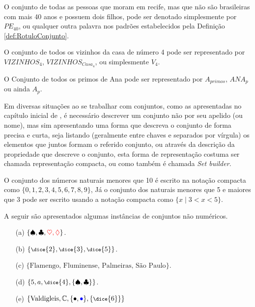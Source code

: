 \begin{exemplo}\label{exe:RotuloConjunto1}
  O conjunto de todas as pessoas que moram em recife, mas que não são brasileiras com mais 40 anos e possuem dois filhos, pode ser denotado simplesmente por $PE_{40}$, ou qualquer outra palavra nos padrões estabelecidos pela Definição \ref{def:RotuloConjunto}.
\end{exemplo}

\begin{exemplo}\label{exe:RotuloConjunto2}
	O conjunto de todos os vizinhos da casa de número 4 pode ser representado por $VIZINHOS_4$, $VIZINHOS_{Casa_4}$, ou simplesmente  $V_4$.
\end{exemplo}

\begin{exemplo}\label{exe:RotuloConjunto3}
  O Conjunto de todos os primos de Ana pode ser representado por $A_{primos}$, $ANA_{p}$ ou ainda $A_p$.
\end{exemplo}

Em diversas situações ao se trabalhar com conjuntos, como as apresentadas no capítulo inicial de \cite{lipschutz1978-TC}, é necessário descrever um conjunto não por seu apelido (ou nome), mas sim apresentando uma forma que descreva o conjunto de forma precisa e curta, seja listando (geralmente entre chaves e separados por vírgula) os elementos que juntos formam o referido conjunto, ou através da descrição da propriedade que descreve o conjunto, esta forma de representação costuma ser chamada representação compacta, ou como também é chamada \itshape{Set builder}\cite{fmcbook}.

\begin{exemplo}\label{exe:SetBuilder1}
  O conjunto dos números naturais menores que 10 é escrito na notação compacta como  $\{0, 1, 2, 3, 4, 5, 6, 7, 8, 9\}$, Já o conjunto dos naturais menores que 5 e maiores que 3 pode ser escrito usando a notação compacta como $\{x \mid 3 < x < 5\}$.
\end{exemplo}

\begin{exemplo}\label{exe:SetBuilder2}
  A seguir são apresentados algumas instâncias de conjuntos não numéricos.
  \begin{itemize}
    \item[(a)] $\{\spadesuit, \clubsuit, {\color{red} \heartsuit, \lozenge}\}$.
    \item[(b)] $\{{\footnotesize \dice{2}, \dice{3}, \dice{5}}\}$.
    \item[(c)] $\{\mbox{Flamengo, Fluminense, Palmeiras, São Paulo}\}$.
    \item[(d)] $\{5, a, {\footnotesize\dice{4}}, \{\spadesuit, \clubsuit\}\}$.
    \item[(e)] $\{\text{Valdigleis}, \mathbb{C}, \{\bullet, {\color{blue}\bullet}\}, \{{\footnotesize\dice{6}} \}\}$
  \end{itemize}
\end{exemplo}

